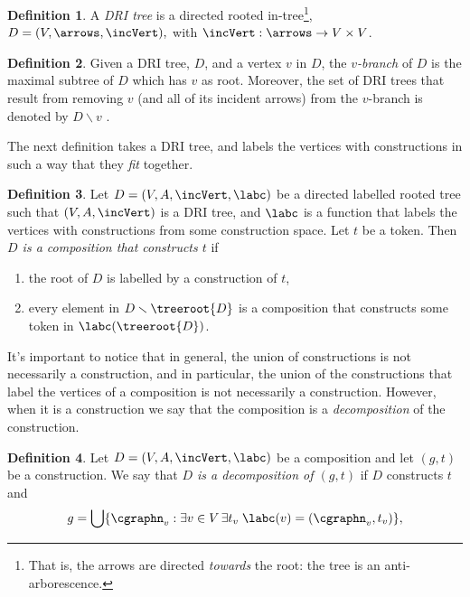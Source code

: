\documentclass[a4paper]{article}
\theoremstyle{definition}
\newtheorem{definition}{Definition}
\begin{document}
		\begin{definition}\label{defn:decompositionTree}
			A \textit{DRI tree} is a directed rooted in-tree\footnote{That is, the arrows are directed \textit{towards} the root: the tree is an anti-arborescence.},
			$D=(V,\arrows, \incVert),$ with $\incVert : \arrows\to V\times V$.
		\end{definition}
	
	\begin{definition}
		Given a DRI tree, $D$, and a vertex $v$ in $D$, the \textit{$v$-branch} of $D$ is the maximal subtree of $D$ which has $v$ as root. Moreover, the set of DRI trees that result from removing $v$ (and all of its incident arrows) from the $v$-branch is denoted by $D \smallsetminus v$ .
	\end{definition}
	The next definition takes a DRI tree, and labels the vertices with constructions in such a way that they \textit{fit} together.
	\begin{definition}
		Let $D = (V,A,\incVert,\labc)$ be a directed labelled rooted tree such that $(V,A,\incVert)$ is a DRI tree, and $\labc$ is a function that labels the vertices with constructions from some construction space. Let $t$ be a token. Then \textit{$D$ is a composition that constructs $t$} if
		\begin{enumerate}[itemsep=2pt]
			\item the root of $D$ is labelled by a construction of $t$,
			\item every element in $D \smallsetminus \treeroot{D}$ is a composition that constructs some token in $\labc(\treeroot{D})$.
		\end{enumerate}
	\end{definition}
	It's important to notice that in general, the union of constructions is not necessarily a construction, and in particular, the union of the constructions that label the vertices of a composition is not necessarily a construction. However, when it is a construction we say that the composition is a \textit{decomposition} of the construction.
		
	
		\begin{definition}\label{defn:constructionOfD}
			Let $D = (V,A,\incVert,\labc)$ be a composition and let $(g,t)$ be a construction. We say that \textit{$D$ is a decomposition of $(g,t)$} if $D$ constructs $t$ and 
			\begin{displaymath}
			g=\bigcup \{\cgraphn_v: \exists v\in V \thinspace \exists t_v \thickspace \labc(v)=(\cgraphn_v,t_v)\},
			\end{displaymath}
		\end{definition}
	
\end{document}
